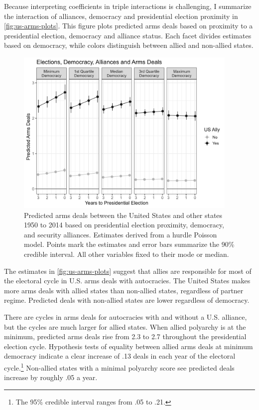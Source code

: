 \documentclass[12pt]{article}
\begin{document}
Because interpreting coefficients in triple interactions is challenging, I summarize the interaction of alliances, democracy and presidential election proximity in \autoref{fig:us-arms-plots}.
This figure plots predicted arms deals based on proximity to a presidential election, democracy and alliance status. 
Each facet divides estimates based on democracy, while colors distinguish between allied and non-allied states. 


\begin{figure}[htpb]
	\centering
		\includegraphics[width=0.95\textwidth]{../figures/us-arms-plots.png}
	\caption{Predicted arms deals between the United States and other states 1950 to 2014 based on presidential election proximity, democracy, and security alliances. Estimates derived from a hurdle Poisson model. Points mark the estimates and error bars summarize the 90\% credible interval. All other variables fixed to their mode or median.}
	\label{fig:us-arms-plots}
\end{figure}


The estimates in \autoref{fig:us-arms-plots} suggest that allies are responsible for most of the electoral cycle in U.S. arms deals with autocracies. 
The United States makes more arms deals with allied states than non-allied states, regardless of partner regime. 
Predicted deals with non-allied states are lower regardless of democracy. 


There are cycles in arms deals for autocracies with and without a U.S. alliance, but the cycles are much larger for allied states. 
When allied polyarchy is at the minimum, predicted arms deals rise from 2.3 to 2.7 throughout the presidential election cycle.
Hypothesis tests of equality between allied arms deals at minimum democracy indicate a clear increase of .13 deals in each year of the electoral cycle.\footnote{The 95\% credible interval ranges from .05 to .21.}
Non-allied states with a minimal polyarchy score see predicted deals increase by roughly .05 a year.
\end{document}
